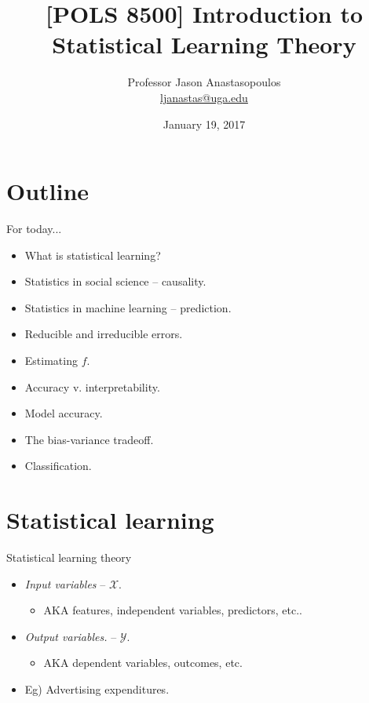 \documentclass{beamer}
\title{[POLS 8500] Introduction to Statistical Learning Theory}
\author{Professor Jason Anastasopoulos\\
			\href{ljanastas@uga.edu}{ljanastas@uga.edu}}
\institute{University of Georgia
			}
\date{January 19, 2017}
\begin{document}
\begin{frame} %
\titlepage
\end{frame}


\section*{Outline}

\begin{frame}{For today...} 
	\begin{itemize}
	 	\item What is statistical learning?
	 	\item Statistics in social science -- causality.
	 	\item Statistics in machine learning -- prediction.
	 	\item	Reducible and irreducible errors.
	 	\item Estimating $f$. 
	 	\item Accuracy v. interpretability.
	 	\item Model accuracy.
	 	\item The bias-variance tradeoff.
	 	\item Classification.
	\end{itemize}
\end{frame}

\section*{Statistical learning}

\begin{frame}{Statistical learning theory} %

 \begin{itemize}
 	\item \textit{Input variables} -- $\mathcal{X}$.
 		\begin{itemize}
 			\item AKA features, independent variables, predictors, etc..
 		\end{itemize}
 	\item \textit{Output variables.} -- $\mathcal{Y}$.
 				\begin{itemize}
 			\item AKA dependent variables, outcomes, etc.
 		\end{itemize}
 	\item Eg) Advertising expenditures.
 \end{itemize}
\end{frame}
\end{document}
